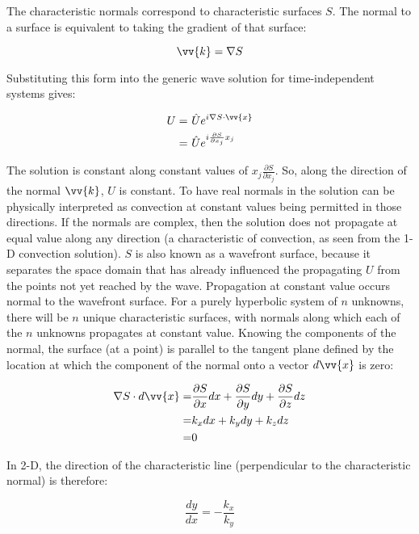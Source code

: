 \documentclass[10pt]{article}
\newcommand{\beq}{\begin{equation}}
\newcommand{\eeq}{\end{equation}}
\newcommand{\beqa}{\begin{equation}\begin{aligned}}
\newcommand{\eeqa}{\end{aligned}\end{equation}}
\begin{document}
\begin{flushleft}
The characteristic normals correspond to characteristic surfaces \(S\). The normal to a surface is equivalent to taking the gradient of that surface:

\beq
\vv{k}=\nabla S
\eeq

Substituting this form into the generic wave solution for time-independent systems gives:

\beqa
U=&\ \hat{U}e^{i\nabla S\cdot\vv{x}}\\
=&\ \hat{U}e^{i\frac{\partial S}{\partial x_j}x_j}
\eeqa

The solution is constant along constant values of \(x_j\frac{\partial S}{\partial x_j}\). So, along the direction of the normal \(\vv{k}\), \(U\) is constant. To have real normals in the solution can be physically interpreted as convection at constant values being permitted in those directions. If the normals are complex, then the solution does not propagate at equal value along any direction (a characteristic of convection, as seen from the 1-D convection solution). \(S\) is also known as a wavefront surface, because it separates the space domain that has already influenced the propagating \(U\) from the points not yet reached by the wave. Propagation at constant value occurs normal to the wavefront surface. For a purely hyperbolic system of \(n\) unknowns, there will be \(n\) unique characteristic surfaces, with normals along which each of the \(n\) unknowns propagates at constant value. Knowing the components of the normal, the surface (at a point) is parallel to the tangent plane defined by the location at which the component of the normal onto a vector \(d\vv{x}\) is zero:

\beqa
\nabla S\cdot d\vv{x}=&\frac{\partial S}{\partial x}dx+\frac{\partial S}{\partial y}dy+\frac{\partial S}{\partial z}dz\\
=&k_xdx+k_ydy+k_zdz\\
=&0
\eeqa

In 2-D, the direction of the characteristic line (perpendicular to the characteristic normal) is therefore:

\beq
\frac{dy}{dx}=-\frac{k_x}{k_y}
\eeq


\end{flushleft}
\end{document}
